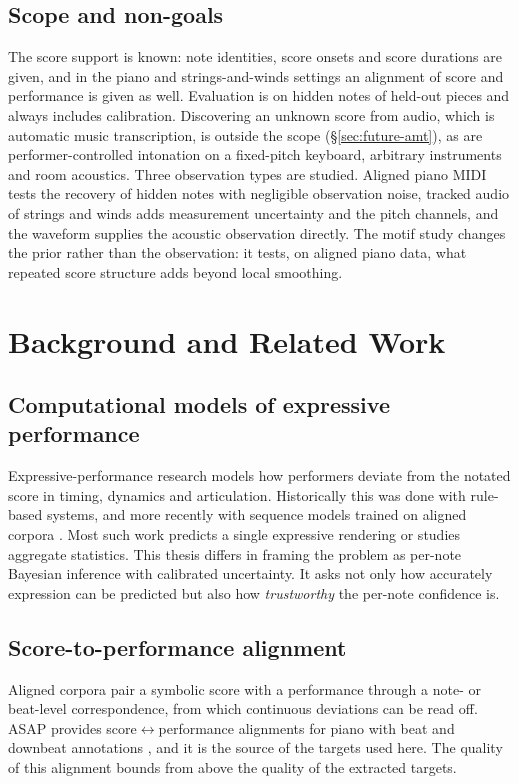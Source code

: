 \documentclass[11pt,a4paper]{report}
\begin{document}
\section{Scope and non-goals}\label{sec:scope}
The score support is known: note identities, score onsets and score
durations are given, and in the piano and strings-and-winds settings an
alignment of score and performance is given as well. Evaluation is on
hidden notes of held-out pieces and always includes calibration. Discovering an
unknown score from audio, which is automatic music transcription, is outside
the scope (\S\ref{sec:future-amt}), as are performer-controlled intonation on
a fixed-pitch keyboard, arbitrary instruments and room acoustics. Three
observation types are studied. Aligned piano MIDI tests the recovery of
hidden notes with negligible observation noise, tracked audio of strings
and winds adds measurement uncertainty and the pitch channels, and the
waveform supplies the acoustic observation directly. The motif study
changes the prior rather than the observation: it tests, on aligned piano
data, what repeated score structure adds beyond local smoothing.


\chapter{Background and Related Work}\label{ch:related}

\section{Computational models of expressive performance}
Expressive-performance research models how performers deviate from the
notated score in timing, dynamics and articulation. Historically this was
done with rule-based systems, and more recently with sequence models trained
on aligned corpora \cite{cancino2018,oore2018}. Most such work predicts a
single expressive rendering or studies aggregate statistics. This thesis
differs in framing the problem as per-note Bayesian inference with
calibrated uncertainty. It asks not only how accurately expression can be
predicted but also how \emph{trustworthy} the per-note confidence is.

\section{Score-to-performance alignment}
Aligned corpora pair a symbolic score with a performance through a note- or
beat-level correspondence, from which continuous deviations can be read off.
ASAP provides score$\leftrightarrow$performance alignments for piano with
beat and downbeat annotations \cite{asap}, and it is the source of the
targets used here. The quality of this alignment bounds from above the
quality of the extracted targets.
\end{document}

